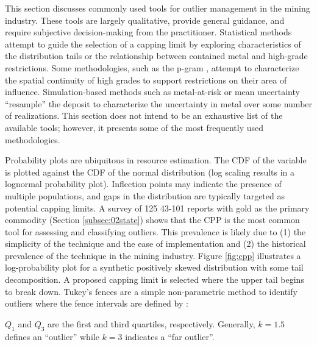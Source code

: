 This section discusses commonly used tools for outlier management in the mining industry. These tools are largely qualitative, provide general guidance, and require subjective decision-making from the practitioner. Statistical methods attempt to guide the selection of a capping limit by exploring characteristics of the distribution tails or the relationship between contained metal and high-grade restrictions. Some methodologies, such as the p-gram \citep{nowak2019optimal}, attempt to characterize the spatial continuity of high grades to support restrictions on their area of influence. Simulation-based methods such as metal-at-risk \citep{parker2006} or mean uncertainty \citep{nowak2013suggestions} ``resample'' the deposit to characterize the uncertainty in metal over some number of realizations. This section does not intend to be an exhaustive list of the available tools; however, it presents some of the most frequently used methodologies.

Probability plots are ubiquitous in resource estimation. The \gls{CDF} of the variable is plotted against the \gls{CDF} of the normal distribution (log scaling results in a lognormal probability plot). Inflection points may indicate the presence of multiple populations, and gaps in the distribution are typically targeted as potential capping limits. A survey of 125 43-101 reports with gold as the primary commodity (Section \ref{subsec:02state}) shows that the \gls{CPP} is the most common tool for assessing and classifying outliers. This prevalence is likely due to (1) the simplicity of the technique and the ease of implementation and (2) the historical prevalence of the technique in the mining industry. Figure \ref{fig:cpp} illustrates a log-probability plot for a synthetic positively skewed distribution with some tail decomposition. A proposed capping limit is selected where the upper tail begins to break down. Tukey's fences are a simple non-parametric method to identify outliers where the fence intervals are defined by \citep{tukey1977exploratory}:
\begin{equation}
    [Q_{1}-k(Q_{3}-Q_{1})), Q_{3}+k(Q_{3}-Q_{1}))]
    \label{eq:tukey}
\end{equation}

$Q_{1}$ and $Q_{3}$ are the first and third quartiles, respectively. Generally, $k=1.5$ defines an ``outlier'' while $k=3$ indicates a ``far outlier''.

